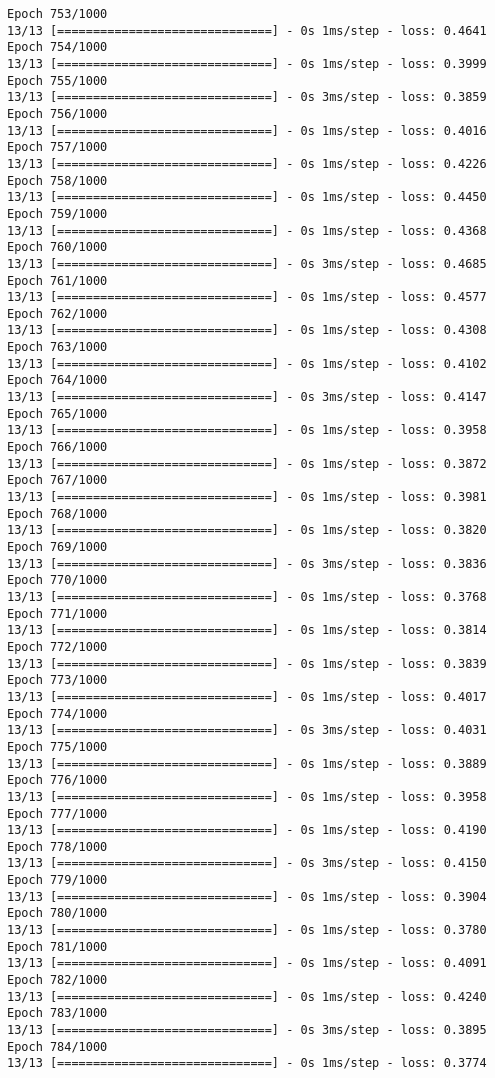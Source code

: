 \documentclass[11pt]{article}
\begin{document}
\begin{Verbatim}[commandchars=\\\{\}]
Epoch 753/1000
13/13 [==============================] - 0s 1ms/step - loss: 0.4641
Epoch 754/1000
13/13 [==============================] - 0s 1ms/step - loss: 0.3999
Epoch 755/1000
13/13 [==============================] - 0s 3ms/step - loss: 0.3859
Epoch 756/1000
13/13 [==============================] - 0s 1ms/step - loss: 0.4016
Epoch 757/1000
13/13 [==============================] - 0s 1ms/step - loss: 0.4226
Epoch 758/1000
13/13 [==============================] - 0s 1ms/step - loss: 0.4450
Epoch 759/1000
13/13 [==============================] - 0s 1ms/step - loss: 0.4368
Epoch 760/1000
13/13 [==============================] - 0s 3ms/step - loss: 0.4685
Epoch 761/1000
13/13 [==============================] - 0s 1ms/step - loss: 0.4577
Epoch 762/1000
13/13 [==============================] - 0s 1ms/step - loss: 0.4308
Epoch 763/1000
13/13 [==============================] - 0s 1ms/step - loss: 0.4102
Epoch 764/1000
13/13 [==============================] - 0s 3ms/step - loss: 0.4147
Epoch 765/1000
13/13 [==============================] - 0s 1ms/step - loss: 0.3958
Epoch 766/1000
13/13 [==============================] - 0s 1ms/step - loss: 0.3872
Epoch 767/1000
13/13 [==============================] - 0s 1ms/step - loss: 0.3981
Epoch 768/1000
13/13 [==============================] - 0s 1ms/step - loss: 0.3820
Epoch 769/1000
13/13 [==============================] - 0s 3ms/step - loss: 0.3836
Epoch 770/1000
13/13 [==============================] - 0s 1ms/step - loss: 0.3768
Epoch 771/1000
13/13 [==============================] - 0s 1ms/step - loss: 0.3814
Epoch 772/1000
13/13 [==============================] - 0s 1ms/step - loss: 0.3839
Epoch 773/1000
13/13 [==============================] - 0s 1ms/step - loss: 0.4017
Epoch 774/1000
13/13 [==============================] - 0s 3ms/step - loss: 0.4031
Epoch 775/1000
13/13 [==============================] - 0s 1ms/step - loss: 0.3889
Epoch 776/1000
13/13 [==============================] - 0s 1ms/step - loss: 0.3958
Epoch 777/1000
13/13 [==============================] - 0s 1ms/step - loss: 0.4190
Epoch 778/1000
13/13 [==============================] - 0s 3ms/step - loss: 0.4150
Epoch 779/1000
13/13 [==============================] - 0s 1ms/step - loss: 0.3904
Epoch 780/1000
13/13 [==============================] - 0s 1ms/step - loss: 0.3780
Epoch 781/1000
13/13 [==============================] - 0s 1ms/step - loss: 0.4091
Epoch 782/1000
13/13 [==============================] - 0s 1ms/step - loss: 0.4240
Epoch 783/1000
13/13 [==============================] - 0s 3ms/step - loss: 0.3895
Epoch 784/1000
13/13 [==============================] - 0s 1ms/step - loss: 0.3774

\end{Verbatim}
\end{document}
